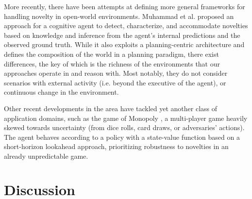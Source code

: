 \documentclass{article}
\begin{document}
More recently, there have been attempts at defining more general frameworks for handling novelty in open-world environments. 
Muhammad et al.  proposed an approach for a cognitive agent to detect, characterize, and accommodate novelties based on knowledge and inference from the agent's internal predictions and the observed ground truth. 
While it also exploits a planning-centric architecture and defines the composition of the world in a planning paradigm, there exist differences, the key of which is the richness of the environments that our approaches operate in and reason with. Most notably, they do not consider scenarios with external activity (i.e. beyond the executive of the agent), or continuous change in the environment. 

Other recent developments in the area have tackled yet another class of application domains, such as the game of Monopoly \cite{gopalakrishnan2021integrating}, a multi-player game heavily skewed towards uncertainty (from dice rolls, card draws, or adversaries' actions). The agent behaves according to a policy with a state-value function based on a short-horizon lookahead approach, prioritizing robustness to novelties in an already unpredictable game. 




\section{Discussion}
\end{document}
